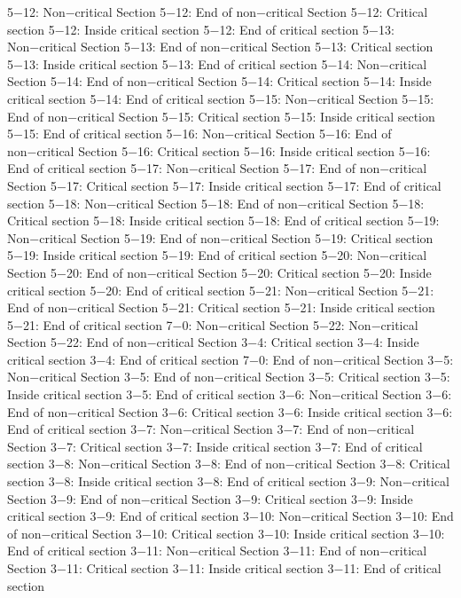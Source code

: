 5−12: Non−critical Section
5−12: End of non−critical Section
5−12: Critical section
5−12: Inside critical section
5−12: End of critical section
5−13: Non−critical Section
5−13: End of non−critical Section
5−13: Critical section
5−13: Inside critical section
5−13: End of critical section
5−14: Non−critical Section
5−14: End of non−critical Section
5−14: Critical section
5−14: Inside critical section
5−14: End of critical section
5−15: Non−critical Section
5−15: End of non−critical Section
5−15: Critical section
5−15: Inside critical section
5−15: End of critical section
5−16: Non−critical Section
5−16: End of non−critical Section
5−16: Critical section
5−16: Inside critical section
5−16: End of critical section
5−17: Non−critical Section
5−17: End of non−critical Section
5−17: Critical section
5−17: Inside critical section
5−17: End of critical section
5−18: Non−critical Section
5−18: End of non−critical Section
5−18: Critical section
5−18: Inside critical section
5−18: End of critical section
5−19: Non−critical Section
5−19: End of non−critical Section
5−19: Critical section
5−19: Inside critical section
5−19: End of critical section
5−20: Non−critical Section
5−20: End of non−critical Section
5−20: Critical section
5−20: Inside critical section
5−20: End of critical section
5−21: Non−critical Section
5−21: End of non−critical Section
5−21: Critical section
5−21: Inside critical section
5−21: End of critical section
7−0: Non−critical Section
5−22: Non−critical Section
5−22: End of non−critical Section
3−4: Critical section
3−4: Inside critical section
3−4: End of critical section
7−0: End of non−critical Section
3−5: Non−critical Section
3−5: End of non−critical Section
3−5: Critical section
3−5: Inside critical section
3−5: End of critical section
3−6: Non−critical Section
3−6: End of non−critical Section
3−6: Critical section
3−6: Inside critical section
3−6: End of critical section
3−7: Non−critical Section
3−7: End of non−critical Section
3−7: Critical section
3−7: Inside critical section
3−7: End of critical section
3−8: Non−critical Section
3−8: End of non−critical Section
3−8: Critical section
3−8: Inside critical section
3−8: End of critical section
3−9: Non−critical Section
3−9: End of non−critical Section
3−9: Critical section
3−9: Inside critical section
3−9: End of critical section
3−10: Non−critical Section
3−10: End of non−critical Section
3−10: Critical section
3−10: Inside critical section
3−10: End of critical section
3−11: Non−critical Section
3−11: End of non−critical Section
3−11: Critical section
3−11: Inside critical section
3−11: End of critical section
